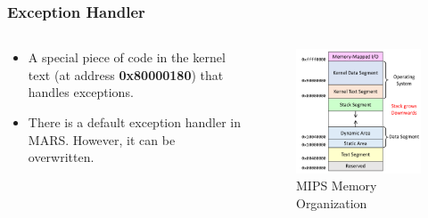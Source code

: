 \documentclass[
	11pt, %
]{beamer}
\begin{document}
\begin{frame}
	\frametitle{Exception Handler}
	\begin{columns}[c]
		\begin{column}{0.5\textwidth}
			\begin{itemize}
				\item A special piece of code in the kernel text (at address \textbf{0x80000180}) that handles exceptions. \pause
				\item There is a default exception handler in MARS. However, it can be overwritten. \pause
			\end{itemize}
		\end{column}
	
		\begin{column}{0.5\textwidth}
			\begin{figure}
				\includegraphics[width=\linewidth]{mips_memory_exception.png}
				\caption{MIPS Memory Organization}
			\end{figure}
		\end{column}
	\end{columns}
\end{frame}

\end{document}
